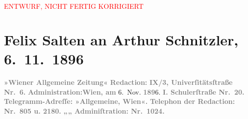 
\begin{center}
            \textcolor{red}{ENTWURF, NICHT FERTIG KORRIGIERT}
                      \end{center}
            
         
         \renewcommand{\erwaehntePersonen}{Personen: Georg Hirschfeld}
         \renewcommand{\erwaehnteInstitutionen}{Institutionen: Wiener Allgemeine Zeitung}
         \renewcommand{\erwaehnteOrte}{Orte: Berlin, Schulerstraße, Universitätsstraße, Wien}
         \renewcommand{\erwaehnteWerke}{Werke: Die Mütter. Schauspiel in vier Acten, Freiwild. Schauspiel in 3 Akten}
               \section[Felix Salten an Arthur Schnitzler, 6. 11. 1896]{ Felix Salten an Arthur Schnitzler, 6. 11. 1896}\nopagebreak{}\rehead{ }\begin{ledgroupsized}[t]{13cm}\normalsize\beginnumbering \toendnotes[C]{\smallbreak\pagebreak[2]} 
\toendnotes[C]{\smallbreak}\pstart
           \noindent{}{\pb}\textcolor{gray}{\textbf{\textbf{»Wiener Allgemeine
                        Zeitung«}}}\pend
           \pstart
           \textcolor{gray}{\textbf{Redaction:}}\pend
           \pstart
           \textcolor{gray}{\textbf{\textbf{IX/3, Univerſitätsſtraße Nr. 6.}}}\pend
           \pstart
           \textcolor{gray}{\textbf{Administration:}}\hfill \textcolor{gray}{\textbf{Wien, am}}{ }6. Nov. \textcolor{gray}{\textbf{189}}6.\pend
           \pstart
           \textcolor{gray}{\textbf{\textbf{I. Schulerſtraße Nr. 20. }}}\pend
           \pstart
           \textcolor{gray}{\textbf{Telegramm-Adreſſe: »Allgemeine, Wien«.}}\pend
           \pstart
           \textcolor{gray}{\textbf{Telephon der Redaction: Nr. 805 u. 2180.}}\pend
           \pstart
           \textcolor{gray}{\textbf{\hspace*{2.5em}„\hspace*{2.5em}„\hspace*{2.5em} Adminiſtration: Nr. 1024.}}\pend

\end{ledgroupsized}
